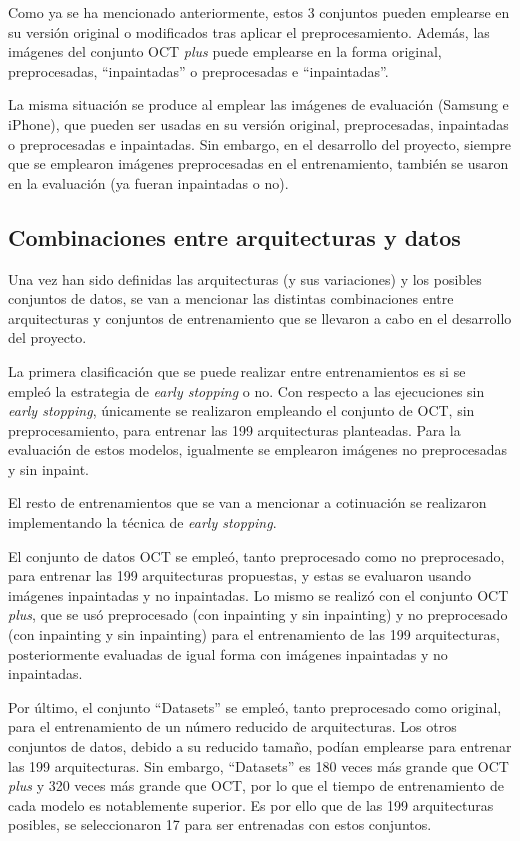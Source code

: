 Como ya se ha mencionado anteriormente, estos 3 conjuntos pueden emplearse en su versión original o modificados tras aplicar el preprocesamiento. Además, las imágenes del conjunto OCT \textit{plus} puede emplearse en la forma original, preprocesadas, ``inpaintadas'' o preprocesadas e ``inpaintadas''.

La misma situación se produce al emplear las imágenes de evaluación (Samsung e iPhone), que pueden ser usadas en su versión original, preprocesadas, inpaintadas o preprocesadas e inpaintadas. Sin embargo, en el desarrollo del proyecto, siempre que se emplearon imágenes preprocesadas en el entrenamiento, también se usaron en la evaluación (ya fueran inpaintadas o no).

\subsection{Combinaciones entre arquitecturas y datos}

Una vez han sido definidas las arquitecturas (y sus variaciones) y los posibles conjuntos de datos, se van a mencionar las distintas combinaciones entre arquitecturas y conjuntos de entrenamiento que se llevaron a cabo en el desarrollo del proyecto.

La primera clasificación que se puede realizar entre entrenamientos es si se empleó la estrategia de \textit{early stopping} o no. Con respecto a las ejecuciones sin \textit{early stopping}, únicamente se realizaron empleando el conjunto de OCT, sin preprocesamiento, para entrenar las 199 arquitecturas planteadas. Para la evaluación de estos modelos, igualmente se emplearon imágenes no preprocesadas y sin inpaint.

El resto de entrenamientos que se van a mencionar a cotinuación se realizaron implementando la técnica de \textit{early stopping}.

El conjunto de datos OCT se empleó, tanto preprocesado como no preprocesado, para entrenar las 199 arquitecturas propuestas, y estas se evaluaron usando imágenes inpaintadas y no inpaintadas. Lo mismo se realizó con el conjunto OCT \textit{plus}, que se usó preprocesado (con inpainting y sin inpainting) y no preprocesado (con inpainting y sin inpainting) para el entrenamiento de las 199 arquitecturas, posteriormente evaluadas de igual forma con imágenes inpaintadas y no inpaintadas.

Por último, el conjunto ``Datasets'' se empleó, tanto preprocesado como original, para el entrenamiento de un número reducido de arquitecturas. Los otros conjuntos de datos, debido a su reducido tamaño, podían emplearse para entrenar las 199 arquitecturas. Sin embargo, ``Datasets'' es 180 veces más grande que OCT \textit{plus} y 320 veces más grande que OCT, por lo que el tiempo de entrenamiento de cada modelo es notablemente superior. Es por ello que de las 199 arquitecturas posibles, se seleccionaron 17 para ser entrenadas con estos conjuntos.

